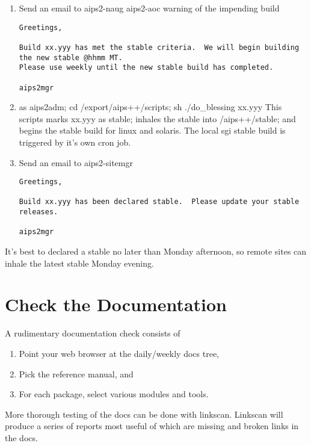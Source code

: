 \begin{enumerate}
\item Send an email to aips2-naug aips2-aoc warning of the impending build
\begin{verbatim}
Greetings,

Build xx.yyy has met the stable criteria.  We will begin building the new stable @hhmm MT.
Please use weekly until the new stable build has completed.

aips2mgr

\end{verbatim}
\item as aips2adm; cd /export/aips++/scripts; sh ./do\_blessing xx.yyy
This scripts marks xx.yyy as stable; inhales the stable into /aips++/stable; and begins the stable
build for linux and solaris.  The local sgi stable build is triggered by it's own cron job.
\item Send an email to aips2-sitemgr
\begin{verbatim}
Greetings,

Build xx.yyy has been declared stable.  Please update your stable releases.

aips2mgr
\end{verbatim}
\end{enumerate}

It's best to declared a stable no later than Monday afternoon, so remote sites can
inhale the latest stable Monday evening.
\section{Check the Documentation}
A rudimentary documentation check consists of 
\begin{enumerate}
\item Point your web browser at the daily/weekly docs tree,
\item Pick the reference manual, and
\item For each package, select various modules and tools.
\end{enumerate}
More thorough testing of the docs can be done with linkscan.  Linkscan will produce a series of 
reports most useful of which are missing and broken links in the docs.
